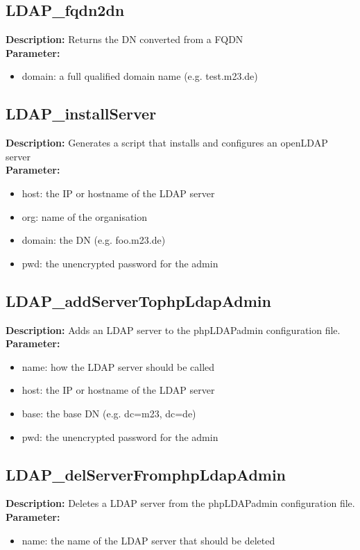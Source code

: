 \subsection{LDAP\_fqdn2dn}
\textbf{Description:} Returns the DN converted from a FQDN\\
\textbf{Parameter:}
\begin{itemize}
\item domain: a full qualified domain name (e.g. test.m23.de)
\end{itemize}

\subsection{LDAP\_installServer}
\textbf{Description:} Generates a script that installs and configures an openLDAP server\\
\textbf{Parameter:}
\begin{itemize}
\item host: the IP or hostname of the LDAP server
\item org: name of the organisation
\item domain: the DN (e.g. foo.m23.de)
\item pwd: the unencrypted password for the admin
\end{itemize}

\subsection{LDAP\_addServerTophpLdapAdmin}
\textbf{Description:} Adds an LDAP server to the phpLDAPadmin configuration file.\\
\textbf{Parameter:}
\begin{itemize}
\item name: how the LDAP server should be called
\item host: the IP or hostname of the LDAP server
\item base: the base DN (e.g. dc=m23, dc=de)
\item pwd: the unencrypted password for the admin
\end{itemize}

\subsection{LDAP\_delServerFromphpLdapAdmin}
\textbf{Description:} Deletes a LDAP server from the phpLDAPadmin configuration file.\\
\textbf{Parameter:}
\begin{itemize}
\item name: the name of the LDAP server that should be deleted
\end{itemize}

